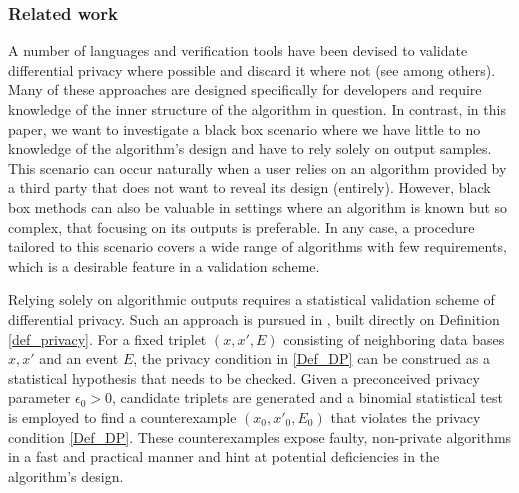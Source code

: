 \documentclass[conference]{IEEEtran}
\begin{document}
\subsubsection*{\textbf{Related work}}
A number of languages and verification tools have been devised to validate differential privacy where possible and discard it where not (see \cite{Reed2010, Gaobardi2013,Barthe2013,Barthe2014,Barthe2016,Barthe2016b,Hsu2017, Zhang2017,Kifer2019,Pierce2020,Barthe2020,CheckDP} among others). Many of these approaches are designed specifically for developers and require knowledge of the inner structure of the algorithm in question. In contrast, in this paper, we want to investigate a black box scenario where we have little to no knowledge of the algorithm's design and have to rely solely on output samples. This scenario can occur naturally when a user relies on an algorithm provided by a third party that does not want to reveal its design (entirely). However, black box methods can also be valuable in settings where an algorithm is known but so complex, that focusing on its outputs is preferable. In any case, a procedure tailored to this scenario covers a wide range of algorithms with few requirements, which is a desirable feature in a validation scheme.

Relying solely on algorithmic outputs requires a statistical validation scheme of differential privacy. Such an approach is pursued in \cite{StatDP}, built directly on Definition \ref{def_privacy}. For a fixed triplet $(x,x',E)$ consisting of neighboring data bases $x,x'$ and an event $E$, the privacy condition in \eqref{Def_DP} can be construed as a statistical hypothesis that needs to be checked. Given a preconceived privacy parameter $\epsilon_0 > 0$, candidate triplets
are generated and a binomial statistical test is employed to find a counterexample $(x_0,x'_0,E_0)$ that violates the privacy condition \eqref{Def_DP}.
These counterexamples expose faulty, non-private algorithms in a fast and practical manner and hint at potential deficiencies in the algorithm's design.
\end{document}
